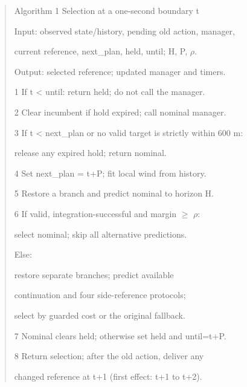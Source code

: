 \documentclass[conference]{IEEEtran}
\begin{document}
\begin{quote}\small
\noindent\hspace*{0.0em}Algorithm 1  Selection at a one-second boundary t\par
\noindent\hspace*{0.0em}Input: observed state/history, pending old action, manager,\par
\noindent\hspace*{2.66em}current reference, next\_plan, held, until; H, P, \ensuremath{\rho}.\par
\noindent\hspace*{0.0em}Output: selected reference; updated manager and timers.\par
\noindent\hspace*{0.0em}1  If t < until: return held; do not call the manager.\par
\noindent\hspace*{0.0em}2  Clear incumbent if hold expired; call nominal manager.\par
\noindent\hspace*{0.0em}3  If t < next\_plan or no valid target is strictly within 600 m:\par
\noindent\hspace*{2.66em}release any expired hold; return nominal.\par
\noindent\hspace*{0.0em}4  Set next\_plan = t+P; fit local wind from history.\par
\noindent\hspace*{0.0em}5  Restore a branch and predict nominal to horizon H.\par
\noindent\hspace*{0.0em}6  If valid, integration-successful and margin \ensuremath{\ge} \ensuremath{\rho}:\par
\noindent\hspace*{2.66em}select nominal; skip all alternative predictions.\par
\noindent\hspace*{1.1400000000000001em}Else:\par
\noindent\hspace*{2.66em}restore separate branches; predict available\par
\noindent\hspace*{2.66em}continuation and four side-reference protocols;\par
\noindent\hspace*{2.66em}select by guarded cost or the original fallback.\par
\noindent\hspace*{0.0em}7  Nominal clears held; otherwise set held and until=t+P.\par
\noindent\hspace*{0.0em}8  Return selection; after the old action, deliver any\par
\noindent\hspace*{1.1400000000000001em}changed reference at t+1 (first effect: t+1 to t+2).\par
\end{quote}
\end{document}
